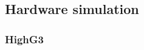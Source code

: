 \subsection{Hardware simulation}

\subsubsection{HighG3}


\begin{comment}
\begin{table}[!htb]
\centering
\begin{tabular}{|l|l|l|}
\hline
\rowcolor[HTML]{C0C0C0} 
Channel number & Satellite number & Phase jitter       \\ \hline
0              & 3                & 7.09 \\ \hline
\rowcolor[HTML]{EFEFEF} 
1              & 6                & 7.18 \\ \hline
2              & 11               & 7.11 \\ \hline
\rowcolor[HTML]{EFEFEF} 
3              & 14               & 7.12 \\ \hline
4              & 16               & 6.87 \\ \hline
\rowcolor[HTML]{EFEFEF} 
5              & 18               & 5.68 \\ \hline
6              & 19               & 7.14  \\ \hline
\rowcolor[HTML]{EFEFEF} 
7              & 22               & 7.15 \\ \hline
\end{tabular}
\caption{CNO = 48,PLLBW =32,FLL=0}
\label{my-label}
\end{table}




\begin{table}[!htb]
\centering
\begin{tabular}{|l|l|l|}
\hline
\rowcolor[HTML]{C0C0C0} 
Channel number & Satellite number & Phase jitter       \\ \hline
0              & 14               & 5.37 \\ \hline
\rowcolor[HTML]{EFEFEF} 
1              & 3                & 9.16 \\ \hline
2              & 6                & 9.21 \\ \hline
\rowcolor[HTML]{EFEFEF} 
3              & 18               & 9.35 \\ \hline
4              & 11               & 9.11 \\ \hline
\rowcolor[HTML]{EFEFEF} 
5              & 16               & 9.06 \\ \hline
6              & 19               & 9.07 \\ \hline
\rowcolor[HTML]{EFEFEF} 
7              & 22               & 7.89 \\ \hline
\end{tabular}
\caption{CNO = 42,PLLBW =32,FLL=0}
\label{my-label}
\end{table}
\end{comment}


